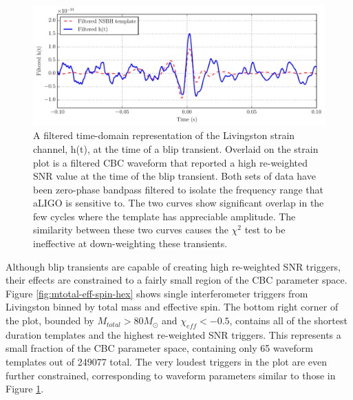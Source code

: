 \begin{figure}[!ht]%
\centering
  \includegraphics[width=\textwidth]{figures/o1-cbc-dq-paper/Blip-cbc-waveform}
  \caption[Time-series plot of blip transient]{A filtered time-domain representation of the Livingston strain channel, h(t), at %
           the time of a blip transient. Overlaid on the strain plot is a filtered CBC waveform that reported %
           a high re-weighted SNR value at the time of the blip transient. Both sets of data %
           have been zero-phase bandpass filtered to isolate the frequency range that aLIGO %
           is sensitive to. %
           The two curves show significant overlap %
           in the few cycles where the template has appreciable amplitude. The similarity between %
           these two curves causes the $\chi^{2}$ test to be ineffective at down-weighting these transients.}
\label{fig:Blip-cbc-waveform}
\end{figure}

Although blip transients are capable of creating high re-weighted SNR triggers, their effects are
constrained to a fairly small region of the CBC parameter space.
Figure \ref{fig:mtotal-eff-spin-hex} shows single interferometer
triggers from Livingston binned by total mass and effective spin.
The bottom right corner of the plot, bounded by $M_{total} > 80 M_{\odot}$ and
$\chi_{eff} < -0.5$, contains all of the shortest duration templates and the highest
re-weighted SNR triggers. This represents a small fraction of the CBC parameter
space, containing only 65 waveform templates out of 249077 total.
The very loudest triggers in the plot are even further constrained,
corresponding to waveform parameters similar to those in Figure \ref{fig:Blip-cbc-waveform}.

